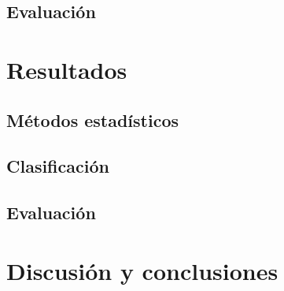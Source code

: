\documentclass[colorinlistoftodos]{article}
\begin{document}

\subsection{Evaluaci\'on}

\section{Resultados}
\subsection{M\'etodos estad\'isticos}

\subsection{Clasificaci\'on}
\subsection{Evaluaci\'on}

\section{Discusi\'on y conclusiones}




\listoftodos%
\end{document}
